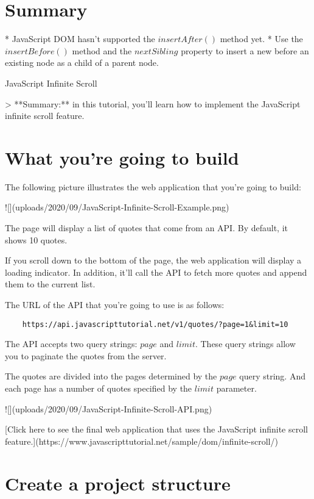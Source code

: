 \documentclass[11pt]{article}
\begin{document}
\section*{Summary}

* JavaScript DOM hasn't supported the $insertAfter()$ method yet.
* Use the $insertBefore()$ method and the $nextSibling$ property
to insert a new before an existing node as a child of a parent node.

{\huge JavaScript Infinite Scroll}

> **Summary:** in this tutorial, you'll learn how to implement the
JavaScript infinite scroll feature.

\section*{What you're going to build}

The following picture illustrates the web application that
you're going to build:

![](uploads/2020/09/JavaScript-Infinite-Scroll-Example.png)

The page will display a list of quotes that come from an API.
By default, it shows 10 quotes.

If you scroll down to the bottom of the page, the web application will
display a loading indicator. In addition, it'll call the API to fetch
more quotes and append them to the current list.

The URL of the API that you're going to use is as follows:

\begin{lstlisting}
    https://api.javascripttutorial.net/v1/quotes/?page=1&limit=10
\end{lstlisting}

The API accepts two query strings: $page$ and $limit$. These query
strings allow you to paginate the quotes from the server.

The quotes are divided into the pages determined by the $page$ query string.
And each page has a number of quotes specified by the $limit$ parameter.

![](uploads/2020/09/JavaScript-Infinite-Scroll-API.png)

[Click here to see the final web application that uses the JavaScript infinite scroll feature.](https://www.javascripttutorial.net/sample/dom/infinite-scroll/)

\section*{Create a project structure}
\end{document}
